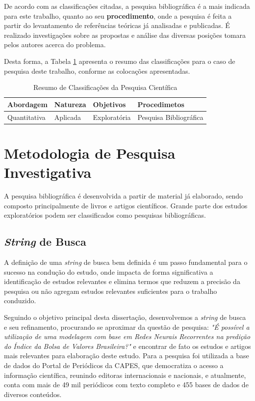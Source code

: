 De acordo com as classificações citadas, a pesquisa bibliográfica é a mais indicada para este trabalho, quanto ao seu \textbf{procedimento}, onde a pesquisa é feita a partir do levantamento de referências teóricas já analisadas e publicadas. É realizado investigações sobre as propostas e análise das diversas posições tomara pelos autores acerca do problema.

Desta forma, a Tabela \ref{resumo_pc} apresenta o resumo das classificações para o caso de pesquisa deste trabalho, conforme as colocações apresentadas.

\begin{table}[H]
\caption{Resumo de Classificações da Pesquisa Científica}

\label{resumo_pc}

\centering

\begin{tabular}{llll}
\hline
\textbf{Abordagem} & \textbf{Natureza} & \textbf{Objetivos} & \textbf{Procedimetos}  \\ \hline
Quantitativa       & Aplicada          & Exploratória       & Pesquisa Bibliográfica
\\ \bottomrule
\end{tabular}
\end{table}


\section{Metodologia de Pesquisa Investigativa}
\label{mpi}

A pesquisa bibliográfica é desenvolvida a partir de material já elaborado, sendo composto principalmente de livros e artigos científicos. Grande parte dos estudos exploratórios podem ser classificados como pesquisas bibliográficas. \cite{metodologia1}

\subsection{\textit{String} de Busca}

A definição de uma \textit{string} de busca bem definida é um passo fundamental para o sucesso na condução do estudo, onde impacta de forma significativa a identificação de estudos relevantes e elimina termos que reduzem a precisão da pesquisa ou não agregam estudos relevantes suficientes para o trabalho conduzido. \cite{metodologia3}

Seguindo o objetivo principal desta dissertação, desenvolvemos a \textit{string} de busca e seu refinamento, procurando se aproximar da questão de pesquisa: \textit{"É possível a utilização de uma modelagem com base em Redes Neurais Recorrentes na predição do Índice da Bolsa de Valores Brasileira?"} e encontrar de fato os estudos e artigos mais relevantes para elaboração deste estudo. Para a pesquisa foi utilizada a base de dados do Portal de Periódicos da CAPES, que democratiza o acesso a informação científica, reunindo editoras internacionais e nacionais, e atualmente, conta com mais de 49 mil periódicos com texto completo e 455 bases de dados de diversos conteúdos.\cite{capes}

